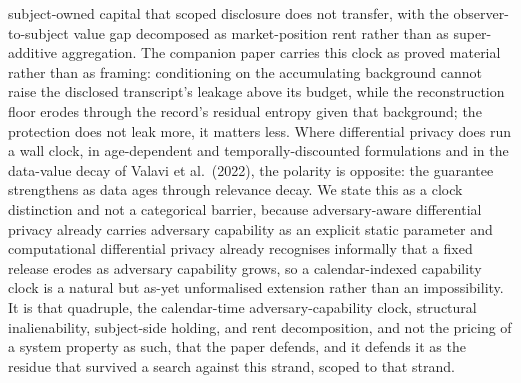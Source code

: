 \documentclass[
  11pt,
]{article}
\begin{document}
subject-owned capital that scoped disclosure does not transfer, with the
observer-to-subject value gap decomposed as market-position rent rather
than as super-additive aggregation. The companion paper carries this
clock as proved material rather than as framing: conditioning on the
accumulating background cannot raise the disclosed transcript's leakage
above its budget, while the reconstruction floor erodes through the
record's residual entropy given that background; the protection does not
leak more, it matters less. Where differential privacy does run a wall
clock, in age-dependent and temporally-discounted formulations and in
the data-value decay of Valavi et al.~(2022), the polarity is opposite:
the guarantee strengthens as data ages through relevance decay. We state
this as a clock distinction and not a categorical barrier, because
adversary-aware differential privacy already carries adversary
capability as an explicit static parameter and computational
differential privacy already recognises informally that a fixed release
erodes as adversary capability grows, so a calendar-indexed capability
clock is a natural but as-yet unformalised extension rather than an
impossibility. It is that quadruple, the calendar-time
adversary-capability clock, structural inalienability, subject-side
holding, and rent decomposition, and not the pricing of a system
property as such, that the paper defends, and it defends it as the
residue that survived a search against this strand, scoped to that
strand.
\end{document}
